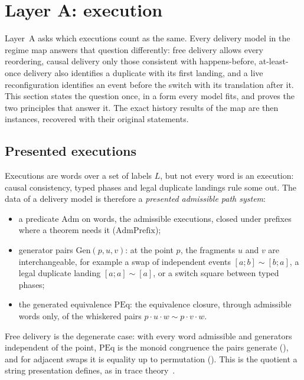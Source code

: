 
\section{Layer A: execution}\label{sec:layer-a}

Layer~A asks which executions count as the same. Every delivery model in the regime map answers that
question differently: free delivery allows every reordering, causal delivery only those consistent
with happens-before, at-least-once delivery also identifies a duplicate with its first landing, and a
live reconfiguration identifies an event before the switch with its translation after it. This section
states the question once, in a form every model fits, and proves the two principles that answer it.
The exact history results of the map are then instances, recovered with their original statements.

\subsection{Presented executions}

Executions are words over a set of labels $L$, but not every word is an execution: causal
consistency, typed phases and legal duplicate landings rule some out. The data of a delivery model is
therefore a \emph{presented admissible path system}:
\begin{itemize}[nosep]
  \item a predicate $\mathrm{Adm}$ on words, the admissible executions, closed under prefixes where a
    theorem needs it ($\mathrm{AdmPrefix}$);
  \item generator pairs $\mathrm{Gen}(p, u, v)$: at the point $p$, the fragments $u$ and $v$ are
    interchangeable, for example a swap of independent events $[a; b] \sim [b; a]$, a legal duplicate
    landing $[a; a] \sim [a]$, or a switch square between typed phases;
  \item the generated equivalence $\mathrm{PEq}$: the equivalence closure, through admissible words
    only, of the whiskered pairs $p \cdot u \cdot w \sim p \cdot v \cdot w$.
\end{itemize}
Free delivery is the degenerate case: with every word admissible and generators independent of the
point, $\mathrm{PEq}$ is the monoid congruence the pairs generate (), and for
adjacent swaps it is equality up to permutation (). This is the quotient a string
presentation defines, as in trace theory~\cite{cartier1969,mazurkiewicz1977}.


